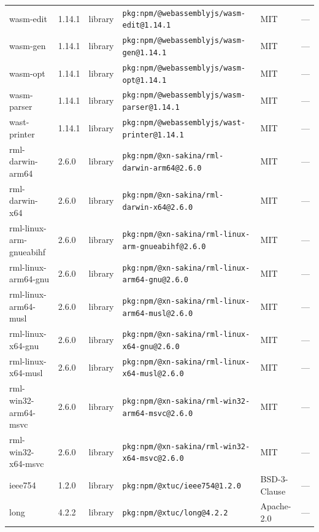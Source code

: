 \documentclass[11pt,a4paper]{article}
\begin{document}
\begin{longtable}{|p{4cm}|p{2cm}|p{1.6cm}|p{5cm}|p{1.5cm}|p{3.5cm}|}
\raggedright wasm-edit & 1.14.1 & library & \small\texttt{pkg:npm/@webassemblyjs/wasm-edit@1.14.1} & MIT & \small — \\
\raggedright wasm-gen & 1.14.1 & library & \small\texttt{pkg:npm/@webassemblyjs/wasm-gen@1.14.1} & MIT & \small — \\
\raggedright wasm-opt & 1.14.1 & library & \small\texttt{pkg:npm/@webassemblyjs/wasm-opt@1.14.1} & MIT & \small — \\
\raggedright wasm-parser & 1.14.1 & library & \small\texttt{pkg:npm/@webassemblyjs/wasm-parser@1.14.1} & MIT & \small — \\
\raggedright wast-printer & 1.14.1 & library & \small\texttt{pkg:npm/@webassemblyjs/wast-printer@1.14.1} & MIT & \small — \\
\raggedright rml-darwin-arm64 & 2.6.0 & library & \small\texttt{pkg:npm/@xn-sakina/rml-darwin-arm64@2.6.0} & MIT & \small — \\
\raggedright rml-darwin-x64 & 2.6.0 & library & \small\texttt{pkg:npm/@xn-sakina/rml-darwin-x64@2.6.0} & MIT & \small — \\
\raggedright rml-linux-arm-gnueabihf & 2.6.0 & library & \small\texttt{pkg:npm/@xn-sakina/rml-linux-arm-gnueabihf@2.6.0} & MIT & \small — \\
\raggedright rml-linux-arm64-gnu & 2.6.0 & library & \small\texttt{pkg:npm/@xn-sakina/rml-linux-arm64-gnu@2.6.0} & MIT & \small — \\
\raggedright rml-linux-arm64-musl & 2.6.0 & library & \small\texttt{pkg:npm/@xn-sakina/rml-linux-arm64-musl@2.6.0} & MIT & \small — \\
\raggedright rml-linux-x64-gnu & 2.6.0 & library & \small\texttt{pkg:npm/@xn-sakina/rml-linux-x64-gnu@2.6.0} & MIT & \small — \\
\raggedright rml-linux-x64-musl & 2.6.0 & library & \small\texttt{pkg:npm/@xn-sakina/rml-linux-x64-musl@2.6.0} & MIT & \small — \\
\raggedright rml-win32-arm64-msvc & 2.6.0 & library & \small\texttt{pkg:npm/@xn-sakina/rml-win32-arm64-msvc@2.6.0} & MIT & \small — \\
\raggedright rml-win32-x64-msvc & 2.6.0 & library & \small\texttt{pkg:npm/@xn-sakina/rml-win32-x64-msvc@2.6.0} & MIT & \small — \\
\raggedright ieee754 & 1.2.0 & library & \small\texttt{pkg:npm/@xtuc/ieee754@1.2.0} & BSD-3-Clause & \small — \\
\raggedright long & 4.2.2 & library & \small\texttt{pkg:npm/@xtuc/long@4.2.2} & Apache-2.0 & \small — \\

\end{longtable}
\end{document}
